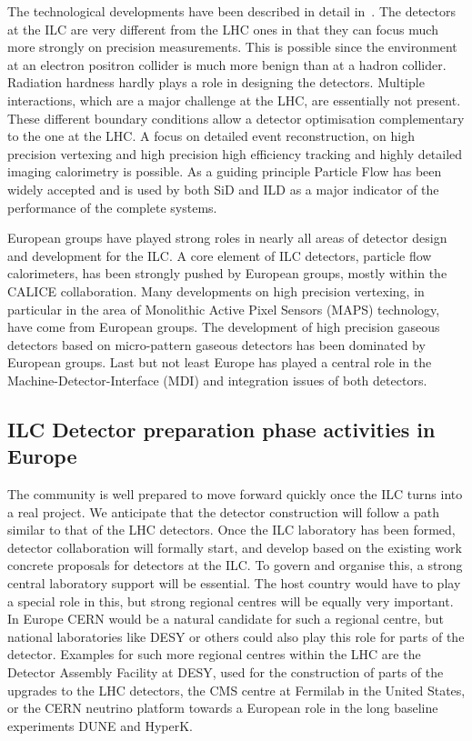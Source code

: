 \documentclass[%
 reprint,
 floatfix,
 amsmath,amssymb,
 aps,
]{revtex4-1}
\begin{document}
The technological developments have been described in detail in~\cite{ILCESU1}. 
The detectors at the ILC are very different from the LHC ones in that they 
can focus much more strongly on precision measurements. This is possible since 
the environment at an electron positron collider is much more benign than at a 
hadron collider. Radiation hardness hardly plays a role in designing the 
detectors. Multiple interactions, which are a major challenge at the LHC, are 
essentially not present. These different boundary conditions allow a detector 
optimisation complementary to the one at the LHC. A focus on detailed event 
reconstruction, on high precision vertexing and high precision high efficiency 
tracking and highly detailed imaging calorimetry is possible. As a guiding 
principle Particle Flow has been widely accepted and is used by both SiD and ILD 
as a major indicator of the performance of the complete systems. 

European groups have played strong roles in nearly all areas of detector design 
and development for the ILC. A core element of ILC detectors, particle flow 
calorimeters, has been strongly pushed by European groups, mostly within the CALICE collaboration. Many developments on 
high precision vertexing, in particular in the area of Monolithic Active Pixel 
Sensors (MAPS) technology, have come from European groups. The development of 
high precision gaseous detectors based on micro-pattern gaseous detectors has 
been dominated by European groups. Last but not least Europe has played a 
central role in the Machine-Detector-Interface (MDI) and integration issues of 
both detectors.

\subsection{ILC Detector preparation phase activities in Europe~\label{sec:det:prepphase}}
The community is well prepared to move forward quickly once the ILC turns into a 
real project. We anticipate that the detector construction will follow a path 
similar to that of the LHC detectors. Once the ILC laboratory has been formed, 
detector collaboration will formally start, and develop based on the existing 
work concrete proposals for detectors at the ILC. To govern and organise this, a 
strong central laboratory support will be essential. The host country would have 
to play a special role in this, but strong regional centres will be equally very 
important. In Europe CERN would be a natural candidate for such a regional 
centre, but national laboratories like DESY or others could also play this role 
for parts of the detector. Examples for such more regional centres within the 
LHC are the Detector Assembly Facility at DESY, used for the construction of 
parts of the upgrades to the LHC detectors, the CMS centre at Fermilab in the 
United States, or the CERN neutrino platform towards a European role in the long 
baseline experiments DUNE and HyperK. 
\end{document}
